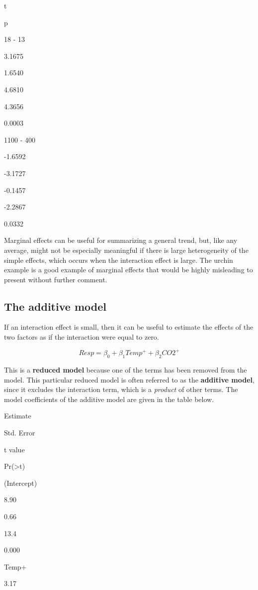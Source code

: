 \documentclass[]{book}
\begin{document}
t

p

18 - 13

3.1675

1.6540

4.6810

4.3656

0.0003

1100 - 400

-1.6592

-3.1727

-0.1457

-2.2867

0.0332

Marginal effects can be useful for summarizing a general trend, but,
like any average, might not be especially meaningful if there is large
heterogeneity of the simple effects, which occurs when the interaction
effect is large. The urchin example is a good example of marginal
effects that would be highly misleading to present without further
comment.

\subsection{The additive model}\label{the-additive-model}

If an interaction effect is small, then it can be useful to estimate the
effects of the two factors as if the interaction were equal to zero.

\begin{equation}
Resp = \beta_0 + \beta_1Temp^+ + \beta_2CO2^+
\end{equation}

This is a \textbf{reduced model} because one of the terms has been
removed from the model. This particular reduced model is often referred
to as the \textbf{additive model}, since it excludes the interaction
term, which is a \emph{product} of other terms. The model coefficients
of the additive model are given in the table below.

Estimate

Std. Error

t value

Pr(\textgreater{}\textbar{}t\textbar{})

(Intercept)

8.90

0.66

13.4

0.000

Temp+

3.17
\end{document}
